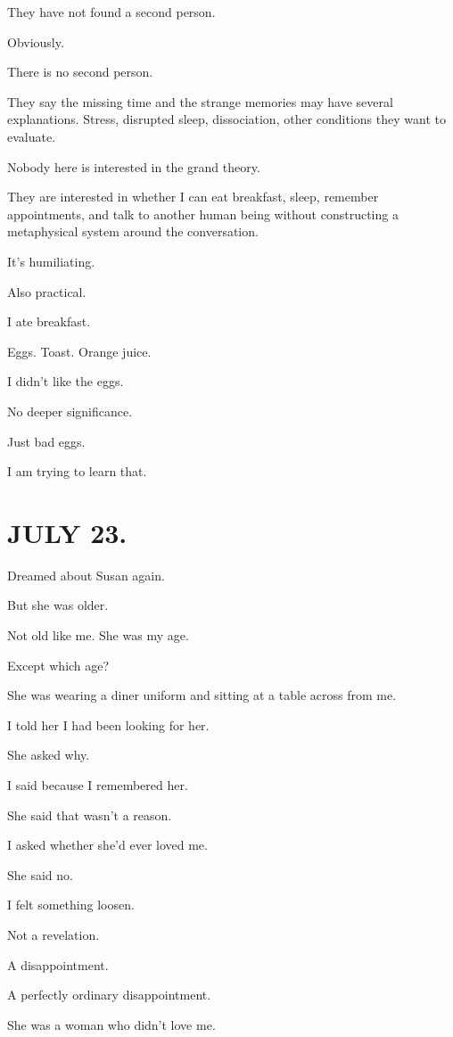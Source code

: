 \documentclass[11pt,oneside]{book}
\begin{document}
They have not found a second person.

Obviously.

There is no second person.

They say the missing time and the strange memories may have several explanations. Stress, disrupted sleep, dissociation, other conditions they want to evaluate.

Nobody here is interested in the grand theory.

They are interested in whether I can eat breakfast, sleep, remember appointments, and talk to another human being without constructing a metaphysical system around the conversation.

It's humiliating.

Also practical.

I ate breakfast.

Eggs. Toast. Orange juice.

I didn't like the eggs.

No deeper significance.

Just bad eggs.

I am trying to learn that.

\section*{JULY 23.}

Dreamed about Susan again.

But she was older.

Not old like me. She was my age.

Except which age?

She was wearing a diner uniform and sitting at a table across from me.

I told her I had been looking for her.

She asked why.

I said because I remembered her.

She said that wasn't a reason.

I asked whether she'd ever loved me.

She said no.

I felt something loosen.

Not a revelation.

A disappointment.

A perfectly ordinary disappointment.

She was a woman who didn't love me.
\end{document}
